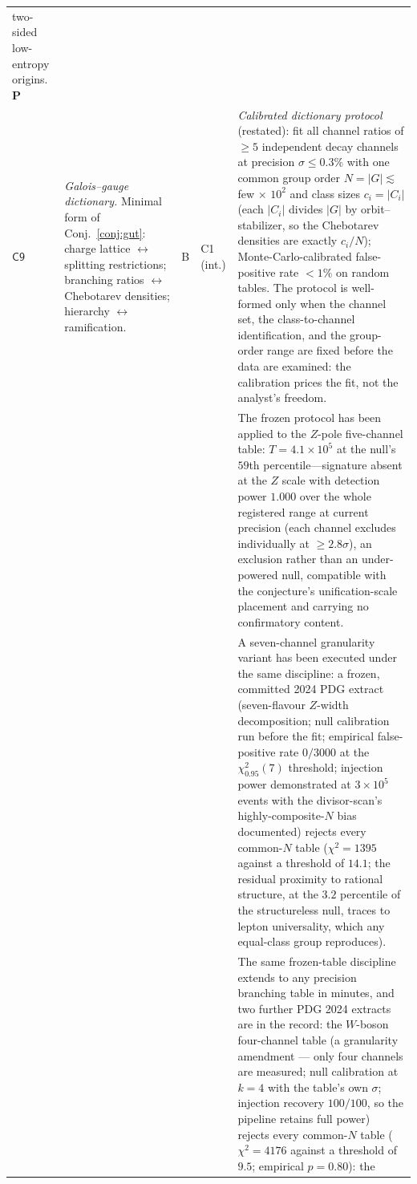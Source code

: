 \begin{longtable}{@{}p{}p{}p{}p{}p{}@{}}
two-sided low-entropy origins. \textbf{P}\\
$\mathsf{C9}$ &
\emph{Galois--gauge dictionary.} Minimal form of Conj.~\ref{conj:gut}: charge lattice
$\leftrightarrow$ splitting restrictions; branching ratios $\leftrightarrow$ Chebotarev
densities; hierarchy $\leftrightarrow$ ramification. &
B &
C1 (int.) &
\emph{Calibrated dictionary protocol} (restated): fit all channel ratios of $\geq5$
independent decay channels at precision $\sigma\leq0.3\%$ with one common group order
$N=|G|\lesssim$ few$\,\times\,10^{2}$ and class sizes $c_{i}=|C_{i}|$ (each $|C_{i}|$ divides
$|G|$ by orbit--stabilizer, so the Chebotarev densities are exactly $c_{i}/N$);
Monte-Carlo-calibrated false-positive rate $<1\%$ on random tables. The protocol is
well-formed only when the channel set, the class-to-channel identification, and the
group-order range are fixed before the data are examined: the calibration prices the fit,
not the analyst's freedom.\\
 & & & & The frozen protocol has been applied to the $Z$-pole
five-channel table: $T=4.1\times10^{5}$ at the null's $59$th percentile---signature absent
at the $Z$ scale with detection power $1.000$ over the whole registered range at current
precision (each channel excludes individually at $\geq2.8\sigma$), an exclusion rather than
an under-powered null, compatible with the conjecture's unification-scale placement and
carrying no confirmatory content.\\
 & & & & A seven-channel granularity variant has been executed
under the same discipline: a frozen, committed 2024 PDG extract (seven-flavour $Z$-width
decomposition; null calibration run before the fit; empirical false-positive rate
$0/3000$ at the $\chi^{2}_{0.95}(7)$ threshold; injection power demonstrated at
$3\times10^{5}$ events with the divisor-scan's highly-composite-$N$ bias documented)
rejects every common-$N$ table ($\chi^{2}=1395$ against a threshold of $14.1$; the residual
proximity to rational structure, at the $3.2$ percentile of the structureless null, traces
to lepton universality, which any equal-class group reproduces).\\
 & & & & The same frozen-table
discipline extends to any precision branching table in minutes, and two further PDG 2024
extracts are in the record: the $W$-boson four-channel table (a granularity amendment
--- only four channels are measured; null calibration at $k=4$ with the table's own
$\sigma$; injection recovery $100/100$, so the pipeline retains full power) rejects every
common-$N$ table ($\chi^{2}=4176$ against a threshold of $9.5$; empirical $p=0.80$): the

\end{longtable}
